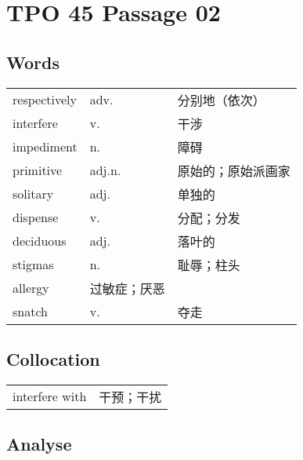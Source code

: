 \section{TPO 45 Passage 02}

\subsection{Words}

\begin{tabular}{lll}
    respectively & adv.   & 分别地（依次）   \\
    interfere    & v.     & 干涉        \\
    impediment   & n.     & 障碍        \\
    primitive    & adj.n. & 原始的；原始派画家 \\
    solitary     & adj.   & 单独的       \\
    dispense     & v.     & 分配；分发     \\
    deciduous    & adj.   & 落叶的       \\
    stigmas      & n.     & 耻辱；柱头     \\
    allergy      & 过敏症；厌恶             \\
    snatch       & v.     & 夺走        \\
\end{tabular}

\subsection{Collocation}

\begin{tabular}{ll}
    interfere with & 干预；干扰 \\
\end{tabular}

\subsection{Analyse}

